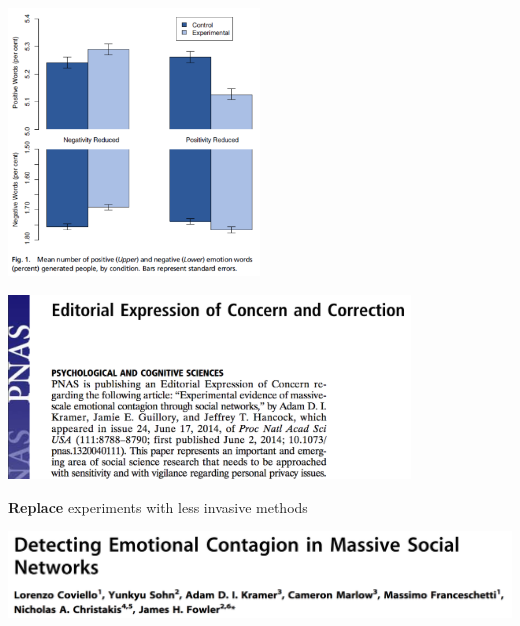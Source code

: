 \documentclass[aspectratio=169]{beamer}
\begin{document}
\begin{frame}

\begin{center}
\includegraphics[width=0.5\textwidth]{figures/kramer_experimental_2014_fig1}
\end{center}

\end{frame}
\begin{frame}

\begin{center}
\includegraphics[width=0.8\textwidth]{figures/kramer_experimental_2014_concern}
\end{center}

\end{frame}
\begin{frame}

\begin{framed}
\textbf{Replace} experiments with less invasive methods
\end{framed}

\pause
\begin{center}
\includegraphics[width=\textwidth]{figures/coviello_detecting_2014_title}
\end{center}

\end{frame}
\end{document}
